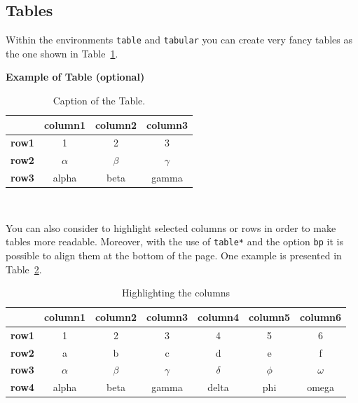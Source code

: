 \documentclass[11pt,a4paper]{article}
\begin{document}
\subsection{Tables}
\label{subsec:tables}

Within the environments \texttt{table} and  \texttt{tabular} you can create very fancy tables as the one shown in Table~\ref{table:example}.

\begin{table}[H]
    \caption*{\textbf{Example of Table (optional)}}
    \centering 
    \begin{tabular}{|p{3em} c c c |}
    \hline
    \rowcolor{bluePoli!40}
     & \textbf{column1} & \textbf{column2} & \textbf{column3} \T\B \\
    \hline \hline
    \textbf{row1} & 1 & 2 & 3 \T\B \\
    \textbf{row2} & $\alpha$ & $\beta$ & $\gamma$ \T\B\\
    \textbf{row3} & alpha & beta & gamma \B\\
    \hline
    \end{tabular}
    \\[10pt]
    \caption{Caption of the Table.}
    \label{table:example}
\end{table}

You can also consider to highlight selected columns or rows in order to make tables more readable.
Moreover, with the use of \texttt{table*} and the option \texttt{bp} it is possible to align them at the bottom of the page. One example is presented in Table~\ref{table:exampleC}. 

\begin{table}[bp]
\centering 
    \begin{tabular}{|p{3em} | c | c | c | c | c | c|}
    \hline
     & \textbf{column1} & \textbf{column2} & \textbf{column3} & \textbf{column4} & \textbf{column5} & \textbf{column6} \T\B \\
    \hline \hline
    \textbf{row1} & 1 & 2 & 3 & 4 & 5 & 6 \T\B\\
    \textbf{row2} & a & b & c & d & e & f \T\B\\
    \textbf{row3} & $\alpha$ & $\beta$ & $\gamma$ & $\delta$ & $\phi$ & $\omega$ \T\B\\
    \textbf{row4} & alpha & beta & gamma & delta & phi & omega \B\\
    \hline
    \end{tabular}
    \\[10pt]
    \caption{Highlighting the columns}
    \label{table:exampleC}
\end{table}
\end{document}
